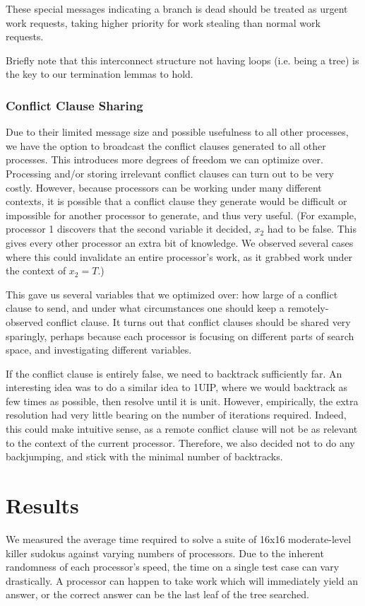 \documentclass{article}
\begin{document}
These special messages indicating a branch is dead should be treated as urgent work requests, taking higher priority for work stealing than normal work requests.

Briefly note that this interconnect structure not having loops (i.e. being a tree) is the key to our termination lemmas to hold.

\subsubsection{Conflict Clause Sharing}

Due to their limited message size and possible usefulness to all other processes, we have the option to broadcast the conflict clauses generated to all other processes.
This introduces more degrees of freedom we can optimize over.
Processing and/or storing irrelevant conflict clauses can turn out to be very costly.
However, because processors can be working under many different contexts, it is possible that a conflict clause they generate would be difficult or impossible for another processor to generate, and thus very useful.
(For example, processor 1 discovers that the second variable it decided, $x_2$ had to be false. This gives every other processor an extra bit of knowledge. We observed several cases where this could invalidate an entire processor's work, as it grabbed work under the context of $x_2 = T$.)

This gave us several variables that we optimized over: how large of a conflict clause to send, and under what circumstances one should keep a remotely-observed conflict clause.
It turns out that conflict clauses should be shared very sparingly, perhaps because each processor is focusing on different parts of search space, and investigating different variables.

If the conflict clause is entirely false, we need to backtrack sufficiently far.
An interesting idea was to do a similar idea to 1UIP, where we would backtrack as few times as possible, then resolve until it is unit.
However, empirically, the extra resolution had very little bearing on the number of iterations required.
Indeed, this could make intuitive sense, as a remote conflict clause will not be as relevant to the context of the current processor.
Therefore, we also decided not to do any backjumping, and stick with the minimal number of backtracks.

\section{Results}
We measured the average time required to solve a suite of 16x16 moderate-level killer sudokus against varying numbers of processors.
Due to the inherent randomness of each processor's speed, the time on a single test case can vary drastically.
A processor can happen to take work which will immediately yield an answer, or the correct answer can be the last leaf of the tree searched.
\end{document}
